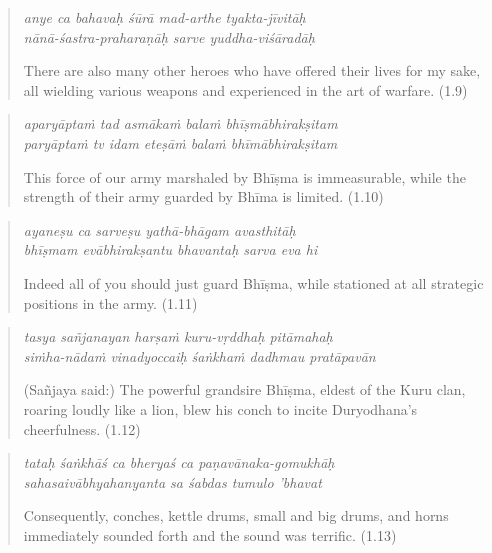 \documentclass[12pt, twoside, openright]{memoir}
\begin{document}
\par
\begin{verse}
\textit{anye ca bahavaḥ śūrā mad-arthe tyakta-jīvitāḥ} \\
\textit{nānā-śastra-praharaṇāḥ sarve yuddha-viśāradāḥ}

\noindent There are also many other heroes who have offered their lives for my sake, all wielding various weapons and experienced in the art of warfare. (1.9)
\end{verse}
\par



\par
\begin{verse}
\textit{aparyāptaṁ tad asmākaṁ balaṁ bhīṣmābhirakṣitam} \\
\textit{paryāptaṁ tv idam eteṣāṁ balaṁ bhīmābhirakṣitam}

\noindent This force of our army marshaled by Bhīṣma is immeasurable, while the strength of their army guarded by Bhīma is limited. (1.10)
\end{verse}
\par



\par
\begin{verse}
\textit{ayaneṣu ca sarveṣu yathā-bhāgam avasthitāḥ} \\
\textit{bhīṣmam evābhirakṣantu bhavantaḥ sarva eva hi}

\noindent Indeed all of you should just guard Bhīṣma, while stationed at all strategic positions in the army. (1.11)
\end{verse}
\par



\par
\begin{verse}
\textit{tasya sañjanayan harṣaṁ kuru-vṛddhaḥ pitāmahaḥ} \\
\textit{siṁha-nādaṁ vinadyoccaiḥ śaṅkhaṁ dadhmau pratāpavān}

\noindent \quad (Sañjaya said:) The powerful grandsire Bhīṣma, eldest of the Kuru clan, roaring loudly like a lion, blew his conch to incite Duryodhana's cheerfulness. (1.12)
\end{verse}
\par



\par
\begin{verse}
\textit{tataḥ śaṅkhāś ca bheryaś ca paṇavānaka-gomukhāḥ} \\
\textit{sahasaivābhyahanyanta sa śabdas tumulo ’bhavat}

\noindent Consequently, conches, kettle drums, small and big drums, and horns immediately sounded forth and the sound was terrific. (1.13)
\end{verse}
\par
\end{document}
